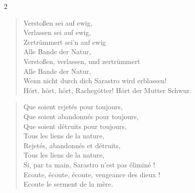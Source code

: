 \documentclass[a4paper,12pt]{article}
\newcommand\chunks[2]{%
\begin{leftcolumn*}\begin{otherlanguage}{german}%
{#1}%
\end{otherlanguage}\end{leftcolumn*}%
\begin{rightcolumn}\begin{otherlanguage}{french}%
{#2}%
\end{otherlanguage}\end{rightcolumn}%
}
\begin{document}
\begin{paracol}{2}
  \chunks{\begin{verse}
          Verstoßen sei auf ewig,\\
          Verlassen sei auf ewig,\\
          Zertrümmert sei’n auf ewig\\
          Alle Bande der Natur,\\
          Verstoßen, verlassen, und zertrümmert\\
          Alle Bande der Natur,\\
          Wenn nicht durch dich Sarastro wird erblassen!\\
          Hört, hört, hört, Rachegötter! Hört der Mutter Schwur.
          \end{verse}}
         {\begin{verse}
          Que soient rejetés pour toujours,\\
          Que soient abandonnés pour toujours,\\
          Que soient détruits pour toujours,\\
          Tous les liens de la nature,\\
          Rejetés, abandonnés et détruits,\\
          Tous les liens de la nature,\\
          Si, par ta main, Sarastro n’est pas éliminé !\\
          Ecoute, écoute, écoute, vengeance des dieux !\\
          Ecoute le serment de la mère.
          \end{verse}}
\end{paracol}
\end{document}

